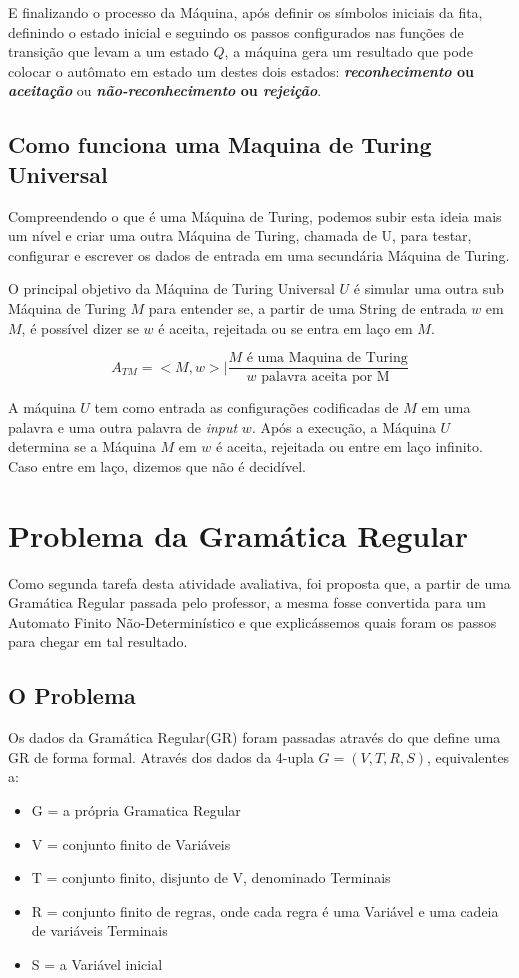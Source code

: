 \documentclass[
	article,			%
	11pt,				%
	oneside,			%
	a4paper,			%
	english,			%
	brazil,				%
	sumario=tradicional
	]{abntex2}
\begin{document}
    E finalizando o processo da Máquina, após definir os símbolos iniciais da fita, definindo o estado inicial e seguindo os passos configurados nas funções de transição que levam a um estado $Q$, a máquina gera um resultado que pode colocar o autômato em estado um destes dois estados: \textbf{\textit{reconhecimento} ou \textit{aceitação}} ou  \textbf{\textit{não-reconhecimento} ou \textit{rejeição}}. 


\subsection{Como funciona uma Maquina de Turing Universal}
    Compreendendo o que é uma Máquina de Turing, podemos subir esta ideia mais um nível e criar uma outra Máquina de Turing, chamada de U, para testar, configurar e escrever os dados de entrada em uma secundária Máquina de Turing. 
    
    O principal objetivo da Máquina de Turing Universal $U$ é simular uma outra sub Máquina de Turing $M$ para entender se, a partir de uma String de entrada $w$ em $M$, é possível dizer se $w$ é aceita, rejeitada ou se entra em laço em $M$.
    
    \[A_{TM} = {<M,w> |  \frac{M\text{ é uma Maquina de Turing}}
                              {w\text{ palavra aceita por M} }} \]
    
    A máquina $U$ tem como entrada as configurações codificadas de $M$ em uma palavra e uma outra palavra de \textit{input} $w$. Após a execução, a Máquina $U$ determina se a Máquina $M$ em $w$ é aceita, rejeitada ou entre em laço infinito. Caso entre em laço, dizemos que não é decidível.
    
\section{Problema da Gramática Regular}
    Como segunda tarefa desta atividade avaliativa, foi proposta que, a partir de uma Gramática Regular passada pelo professor, a mesma fosse convertida para um Automato Finito Não-Determinístico e que explicássemos quais foram os passos para chegar em tal resultado. 
    
\subsection{O Problema}
    Os dados da Gramática Regular(GR) foram passadas através do que define uma GR de forma formal. Através dos dados da 4-upla $G = (V,T,R,S)$, equivalentes a:
    \begin{itemize}
        \item G = a própria Gramatica Regular
        \item V = conjunto finito de Variáveis
        \item T = conjunto finito, disjunto de V, denominado Terminais
        \item R = conjunto finito de regras, onde cada regra é uma Variável e uma cadeia de variáveis Terminais
        \item S = a Variável inicial
    \end{itemize}
    
\end{document}
